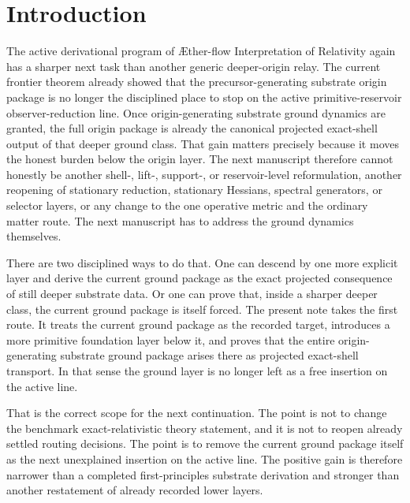 \documentclass[11pt]{article}
\newcommand{\Aflow}{\AE{}ther-flow}
\newcommand{\TheoryName}{\Aflow{} Interpretation of Relativity}
\begin{document}
\section{Introduction}

The active derivational program of \TheoryName{} again has a sharper next task than another generic deeper-origin relay. The current frontier theorem already showed that the precursor-generating substrate origin package is no longer the disciplined place to stop on the active primitive-reservoir observer-reduction line. Once origin-generating substrate ground dynamics are granted, the full origin package is already the canonical projected exact-shell output of that deeper ground class. That gain matters precisely because it moves the honest burden below the origin layer. The next manuscript therefore cannot honestly be another shell-, lift-, support-, or reservoir-level reformulation, another reopening of stationary reduction, stationary Hessians, spectral generators, or selector layers, or any change to the one operative metric and the ordinary matter route. The next manuscript has to address the ground dynamics themselves.

There are two disciplined ways to do that. One can descend by one more explicit layer and derive the current ground package as the exact projected consequence of still deeper substrate data. Or one can prove that, inside a sharper deeper class, the current ground package is itself forced. The present note takes the first route. It treats the current ground package as the recorded target, introduces a more primitive foundation layer below it, and proves that the entire origin-generating substrate ground package arises there as projected exact-shell transport. In that sense the ground layer is no longer left as a free insertion on the active line.

That is the correct scope for the next continuation. The point is not to change the benchmark exact-relativistic theory statement, and it is not to reopen already settled routing decisions. The point is to remove the current ground package itself as the next unexplained insertion on the active line. The positive gain is therefore narrower than a completed first-principles substrate derivation and stronger than another restatement of already recorded lower layers.
\end{document}
